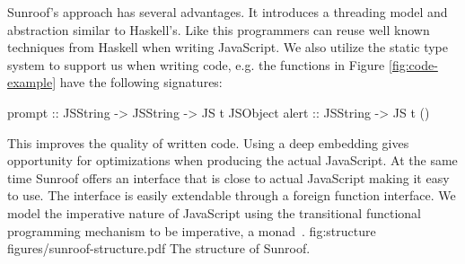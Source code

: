 Sunroof's approach has several advantages. 
It introduces a threading model and abstraction similar
to Haskell's. Like this programmers can reuse well known 
techniques from Haskell when writing JavaScript.
We also utilize the static type system to support us when 
writing code, e.g. the functions
in Figure \ref{fig:code-example} have the following signatures:
\begin{Code}
prompt :: JSString -> JSString -> JS t JSObject
alert  :: JSString -> JS t ()
\end{Code}
This improves the quality of written code.
Using a deep embedding gives opportunity 
for optimizations when producing the actual JavaScript.
At the same time Sunroof offers an interface that is 
close to actual JavaScript making it easy to use.
The interface is easily extendable through
a foreign function interface.
We model the imperative nature of JavaScript
using the transitional functional programming 
mechanism to be imperative, a monad~\cite{Moggi:91:ComputationMonads}.
\Figure%
{fig:structure}%
{figures/sunroof-structure.pdf}%
{The structure of Sunroof.}


